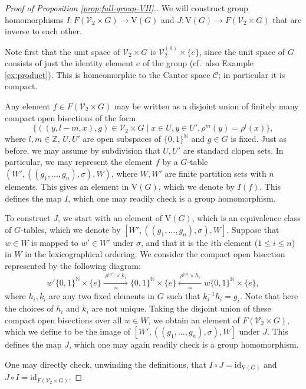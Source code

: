 \documentclass[10pt,a4paper]{amsart}
\numberwithin{equation}{section}
\numberwithin{figure}{section}
\theoremstyle{definition}
\newcommand{\cC}{\mathcal{C}}
\newcommand{\cV}{\mathcal{V}}
\newcommand{\bN}{\mathbb{N}}
\newcommand{\bZ}{\mathbb{Z}}
\newcommand{\V}{\mathrm{V}}
\renewcommand{\leq}{\leqslant}
\begin{document}
\begin{proof}[Proof of Proposition \ref{prop:full-group-VH}.]
We will construct group homomorphisms $I \colon F(\cV_2\times G) \to \V(G)$ and $J \colon \V(G) \to F(\cV_2\times G)$ that are inverse to each other.

Note first that the unit space of $\cV_2 \times G$ is $\cV_2^{(0)} \times \{e\}$, since the unit space of $G$ consists of just the identity element $e$ of the group (cf.\ also Example \ref{ex:product}). This is homeomorphic to the Cantor space $\cC$; in particular it is compact.

Any element $f\in F(\cV_2\times G)$ may be written as a disjoint union of finitely many compact open bisections of the form
\[
\{ ((y,l-m,x),g) \in \cV_2 \times G \mid x\in U, y\in U', \rho^{m}(y) = \rho^l(x) \},
\]
where $l,m\in \bZ$, $U,U'$ are open subspaces of $\{0,1\}^{\bN}$ and $g\in G$ is fixed. Just as before, we may assume by subdivision that $U,U'$ are standard clopen sets. In particular, we may represent the element $f$ by a $G$-table $(W',((g_1,\ldots,g_n),\sigma),W)$, where $W,W'$ are finite partition sets with $n$ elements. This gives an element in $\V(G)$, which we denote by $I(f)$. This defines the map $I$, which one may readily check is a group homomorphism.

To construct $J$, we start with an element of $\V(G)$, which is an equivalence class of $G$-tables, which we denote by $[W',((g_1,\ldots,g_n),\sigma),W]$. Suppose that $w\in W$ is mapped to $w'\in W'$ under $\sigma$, and that it is the $i$th element ($1\leq i\leq n$) in $W$ in the lexicographical ordering. We consider the compact open bisection represented by the following diagram:
\[
w'\{0,1\}^{\bN} \times \{e\} \xrightarrow[\cong]{\;\rho^{\lvert w' \rvert} \times k_i\;} \{0,1\}^{\bN} \times \{e\} \xleftarrow[\cong]{\;\rho^{\lvert w \rvert} \times h_i\;} w\{0,1\}^{\bN} \times \{e\},
\]
where $h_i,k_i$ are any two fixed elements in $G$ such that $k_i^{-1}h_i = g_i$. Note that here the choices of $h_i$ and $k_i$ are not unique. Taking the disjoint union of these compact open bisections over all $w \in W$, we obtain an element of $F(\cV_2\times G)$, which we define to be the image of $[W',((g_1,\ldots,g_n),\sigma),W]$ under $J$. This defines the map $J$, which one may again readily check is a group homomorphism.

One may directly check, unwinding the definitions, that $I\circ J = \mathrm{id}_{\V(G)}$ and $J\circ I = \mathrm{id}_{F(\cV_2\times G)}$.
\end{proof}
\end{document}
